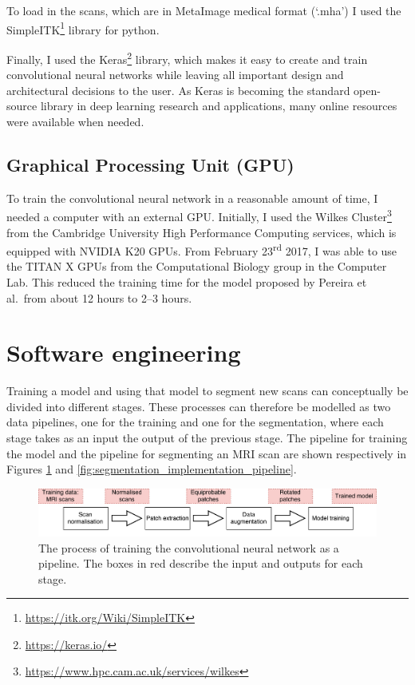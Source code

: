 \documentclass[12pt,a4paper,twoside,openright]{report}
\begin{document}
To load in the scans, which are in MetaImage medical format (`.mha') I used the SimpleITK\footnote{\url{https://itk.org/Wiki/SimpleITK}} library for python.

Finally, I used the Keras\footnote{\url{https://keras.io/}} library, which makes it easy to create and train convolutional neural networks while leaving all important design and architectural decisions to the user. As Keras is becoming the standard open-source library in deep learning research and applications, many online resources were available when needed.

\subsection{Graphical Processing Unit (GPU)}
To train the convolutional neural network in a reasonable amount of time, I needed a computer with an external GPU. Initially, I used the Wilkes Cluster\footnote{\url{https://www.hpc.cam.ac.uk/services/wilkes}} from the Cambridge University High Performance Computing services, which is equipped with NVIDIA K20 GPUs. From February 23\textsuperscript{rd} 2017, I was able to use the TITAN X GPUs from the Computational Biology group in the Computer Lab. This reduced the training time for the model proposed by Pereira et al.\ from about 12 hours to 2--3 hours.

\section{Software engineering}
Training a model and using that model to segment new scans can conceptually be divided into different stages. These processes can therefore be modelled as two data pipelines, one for the training and one for the segmentation, where each stage takes as an input the output of the previous stage. The pipeline for training the model and the pipeline for segmenting an MRI scan are shown respectively in Figures \ref{fig:training_implementation_pipeline} and \ref{fig:segmentation_implementation_pipeline}.

\begin{figure}
	\centering
	\includegraphics[width=\textwidth]{training_implementation_pipeline}
	\caption[The process of training the convolutional neural network as a pipeline]{The process of training the convolutional neural network as a pipeline. The boxes in red describe the input and outputs for each stage.}
	\label{fig:training_implementation_pipeline}
\end{figure}
\end{document}
